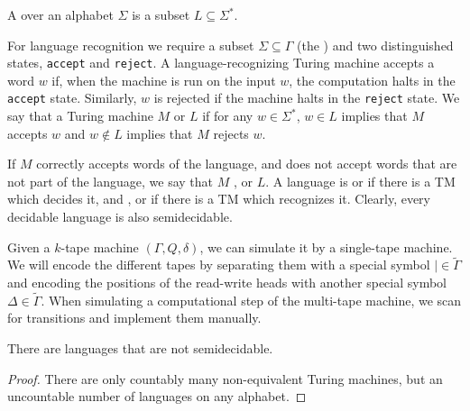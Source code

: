 
\begin{definition}
  A  over an alphabet $\Sigma$ is a subset $L \subseteq
  \Sigma^*$.
\end{definition}

For language recognition we require a subset $\Sigma \subseteq \Gamma$ (the
) and two distinguished states, \texttt{accept} and
\texttt{reject}.
A language-recognizing Turing machine accepts a word $w$ if, when the machine is
run on the input $w$, the computation halts in the \texttt{accept} state.
Similarly, $w$ is rejected if the machine halts in the \texttt{reject} state.
We say that a Turing machine $M$  or  $L$ if for
any $w \in \Sigma^*$, $w \in L$ implies that $M$ accepts $w$ and $w \notin L$
implies that $M$ rejects $w$.

If $M$ correctly accepts words of the language, and does not accept words that
are not part of the language, we say that $M$ ,
 or  $L$.
A language is  or  if there is a TM which
decides it, and ,  or
 if there is a TM which recognizes it.
Clearly, every decidable language is also semidecidable.


Given a $k$-tape machine $(\Gamma, Q, \delta)$, we can simulate it by a
single-tape machine.
We will encode the different tapes by separating them with a special symbol $|
\in \tilde{\Gamma}$ and encoding the positions of the read-write heads with
another special symbol $\Delta \in \tilde{\Gamma}$.
When simulating a computational step of the multi-tape machine, we scan for
transitions and implement them manually.


\begin{proposition}
  There are languages that are not semidecidable.
\end{proposition}

\begin{proof}
  There are only countably many non-equivalent Turing machines, but an
  uncountable number of languages on any alphabet.
\end{proof}

